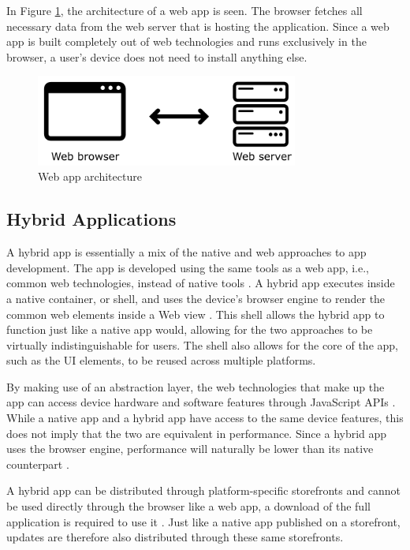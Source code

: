 \documentclass[a4paper,12pt]{article}
\begin{document}
In Figure \ref{fig:webapp}, the architecture of a web app is seen. The browser fetches all necessary data from the web server that is hosting the application. Since a web app is built completely out of web technologies and runs exclusively in the browser, a user’s device does not need to install anything else.

\begin{figure}[h]%
	\centering
	\includegraphics[height=3cm]{img/Other/struct_webapp.png}
	\caption{Web app architecture}%
	\label{fig:webapp}%
\end{figure}

\subsection{Hybrid Applications}
\label{Theory_hybridApps}
A hybrid app is essentially a mix of the native and web approaches to app development. The app is developed using the same tools as a web app, i.e., common web technologies, instead of native tools \cite{mobile_web_apps_2013}. A hybrid app executes inside a native container, or shell, and uses the device’s browser engine to render the common web elements inside a Web view \cite{crossplatform_2012}. This shell allows the hybrid app to function just like a native app would, allowing for the two approaches to be virtually indistinguishable for users. The shell also allows for the core of the app, such as the UI elements, to be reused across multiple platforms.

By making use of an abstraction layer, the web technologies that make up the app can access device hardware and software features through JavaScript APIs \cite{crossplatform_2012}. While a native app and a hybrid app have access to the same device features, this does not imply that the two are equivalent in performance. Since a hybrid app uses the browser engine, performance will naturally be lower than its native counterpart \cite{crossplatform_taxonomy, crossplatform_2012}.

A hybrid app can be distributed through platform-specific storefronts and cannot be used directly through the browser like a web app, a download of the full application is required to use it \cite{crossplatform_2012, mobile_web_apps_2013}. Just like a native app published on a storefront, updates are therefore also distributed through these same storefronts.
\end{document}
